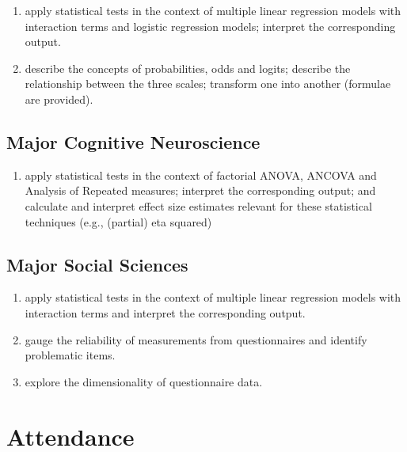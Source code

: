 \documentclass[
  letterpaper,
]{scrbook}
\providecommand{\tightlist}{%
  \setlength{\itemsep}{0pt}\setlength{\parskip}{0pt}}\usepackage{longtable,booktabs,array}
\begin{document}
\begin{enumerate}
\def\labelenumi{\arabic{enumi}.}
\setcounter{enumi}{8}
\tightlist
\item
  apply statistical tests in the context of multiple linear regression
  models with interaction terms and logistic regression models;
  interpret the corresponding output.
\item
  describe the concepts of probabilities, odds and logits; describe the
  relationship between the three scales; transform one into another
  (formulae are provided).
\end{enumerate}

\hypertarget{major-cognitive-neuroscience}{%
\subsection*{Major Cognitive
Neuroscience}\label{major-cognitive-neuroscience}}

\begin{enumerate}
\def\labelenumi{\arabic{enumi}.}
\setcounter{enumi}{10}
\tightlist
\item
  apply statistical tests in the context of factorial ANOVA, ANCOVA and
  Analysis of Repeated measures; interpret the corresponding output; and
  calculate and interpret effect size estimates relevant for these
  statistical techniques (e.g., (partial) eta squared)
\end{enumerate}

\hypertarget{major-social-sciences}{%
\subsection*{Major Social Sciences}\label{major-social-sciences}}

\begin{enumerate}
\def\labelenumi{\arabic{enumi}.}
\setcounter{enumi}{11}
\tightlist
\item
  apply statistical tests in the context of multiple linear regression
  models with interaction terms and interpret the corresponding output.
\item
  gauge the reliability of measurements from questionnaires and identify
  problematic items.
\item
  explore the dimensionality of questionnaire data.
\end{enumerate}

\hypertarget{attendance}{%
\section*{Attendance}\label{attendance}}
\end{document}
